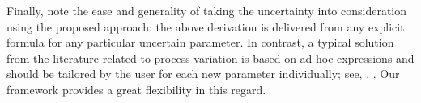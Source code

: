 Finally, note the ease and generality of taking the uncertainty into consideration using the proposed approach: the above derivation is delivered from any explicit formula for any particular uncertain parameter.
In contrast, a typical solution from the literature related to process variation is based on ad hoc expressions and should be tailored by the user for each new parameter individually; see, \eg, \cite{huang2009, bhardwaj2008, ghanta2006}.
Our framework provides a great flexibility in this regard.
